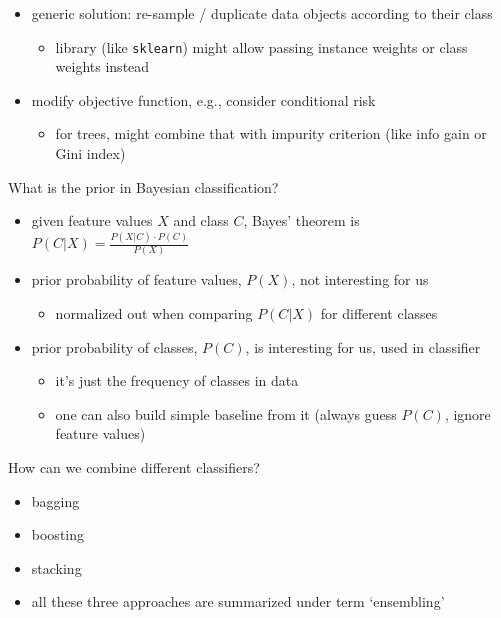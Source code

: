 \documentclass[12pt]{article}
\newcommand{\code}[1]{\textcolor{kitgreen}{\texttt{#1}}}
\begin{document}
\begin{itemize}[left=0pt, nosep]
	\item generic solution: re-sample / duplicate data objects according to their class
	\begin{itemize}[left=0pt, nosep]
		\item library (like \code{sklearn}) might allow passing instance weights or class weights instead
	\end{itemize}
	\item modify objective function, e.g., consider conditional risk
	\begin{itemize}[left=0pt, nosep]
		\item for trees, might combine that with impurity criterion (like info gain or Gini index)
	\end{itemize}
\end{itemize}

\begin{question}
	What is the prior in Bayesian classification?
\end{question}

\begin{itemize}[left=0pt, nosep]
	\item given feature values $X$ and class $C$, Bayes' theorem is $P(C|X) = \frac{P(X|C) \cdot P(C)}{P(X)}$
	\item prior probability of feature values, $P(X)$, not interesting for us
	\begin{itemize}[left=0pt, nosep]
		\item normalized out when comparing $P(C|X)$ for different classes
	\end{itemize}
	\item prior probability of classes, $P(C)$, is interesting for us, used in classifier
	\begin{itemize}[left=0pt, nosep]
		\item it's just the frequency of classes in data
		\item one can also build simple baseline from it (always guess $P(C)$, ignore feature values)
	\end{itemize}
\end{itemize}

\begin{question}
	How can we combine different classifiers?
\end{question}

\begin{itemize}[left=0pt, nosep]
	\item bagging
	\item boosting
	\item stacking
	\item all these three approaches are summarized under term `ensembling'
\end{itemize}
\end{document}
